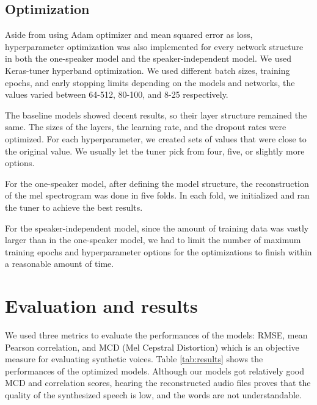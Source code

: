 \documentclass{article}
\begin{document}
\subsection{Optimization}

Aside from using Adam optimizer and mean squared error as loss, hyperparameter optimization was also implemented for every network structure in both the one-speaker model and the speaker-independent model. We used Keras-tuner hyperband optimization. We used different batch sizes, training epochs, and early stopping limits depending on the models and networks, the values varied between 64-512, 80-100, and 8-25 respectively. 

The baseline models showed decent results, so their layer structure remained the same. The sizes of the layers, the learning rate, and the dropout rates were optimized. For each hyperparameter, we created sets of values that were close to the original value. We usually let the tuner pick from four, five, or slightly more options.

For the one-speaker model, after defining the model structure, the reconstruction of the mel spectrogram was done in five folds. In each fold, we initialized and ran the tuner to achieve the best results.

For the speaker-independent model, since the amount of training data was vastly larger than in the one-speaker model, we had to limit the number of maximum training epochs and hyperparameter options for the optimizations to finish within a reasonable amount of time.

\section{Evaluation and results}

We used three metrics to evaluate the performances of the models: RMSE, mean Pearson correlation, and MCD (Mel Cepstral Distortion) which is an objective measure for evaluating synthetic voices. Table \ref{tab:results} shows the performances of the optimized models. Although our models got relatively good MCD and correlation scores, hearing the reconstructed audio files proves that the quality of the synthesized speech is low, and the words are not understandable.
\end{document}
